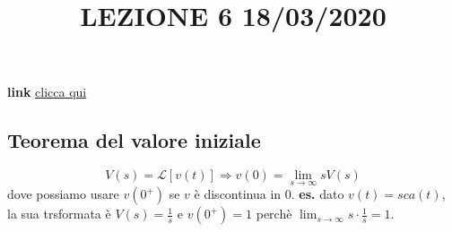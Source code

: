 \title{LEZIONE 6 18/03/2020}\newline
\textbf{link} \href{https://web.microsoftstream.com/video/0c2093a0-44b9-4c83-a0b1-7e61fbd111b5?list=user&userId=faa91214-a6f5-40d7-8875-253fd49b8ce1}{clicca qui}
\subsection{Teorema del valore iniziale}
\[
    V(s) = \mathcal{L}[v(t)] \Longrightarrow v(0) = \lim_{s\rightarrow \infty}s V(s)
\] dove possiamo usare $v(0^+)$ se $v$ è discontinua in $0$.\newline
\newline
\textbf{es.} dato $v(t) = sca(t)$, la sua trsformata è $V(s) = \frac{1}{s}$ e $v(0^+) = 1$ perchè $\lim_{s\rightarrow \infty}s \cdot \frac{1}{s} = 1$.\newline
\newline
